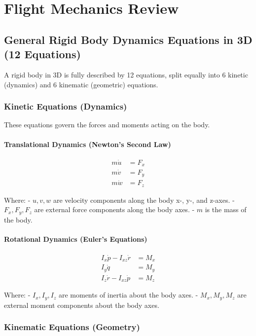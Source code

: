 \documentclass{article}
\begin{document}
\section{Flight Mechanics Review}

\subsection{General Rigid Body Dynamics Equations in 3D (12 Equations)}

A rigid body in 3D is fully described by 12 equations, split equally into 6 kinetic (dynamics) and 6 kinematic (geometric) equations.

\subsubsection{Kinetic Equations (Dynamics)}

These equations govern the forces and moments acting on the body.

\paragraph{Translational Dynamics (Newton’s Second Law)}
\begin{align}
    m \dot{u} &= F_x \\
    m \dot{v} &= F_y \\
    m \dot{w} &= F_z
\end{align}

Where:
- \( u, v, w \) are velocity components along the body x-, y-, and z-axes.
- \( F_x, F_y, F_z \) are external force components along the body axes.
- \( m \) is the mass of the body.

\paragraph{Rotational Dynamics (Euler’s Equations)}
\begin{align}
    I_x \dot{p} - I_{xz} \dot{r} &= M_x \\
    I_y \dot{q} &= M_y \\
    I_z \dot{r} - I_{xz} \dot{p} &= M_z
\end{align}

Where:
- \( I_x, I_y, I_z \) are moments of inertia about the body axes.
- \( M_x, M_y, M_z \) are external moment components about the body axes.

\subsubsection{Kinematic Equations (Geometry)}
\end{document}

